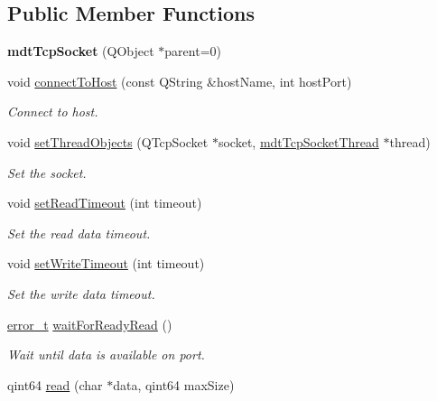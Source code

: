 \subsection*{Public Member Functions}
\begin{DoxyCompactItemize}
\item 
\hypertarget{classmdt_tcp_socket_aeed1a50725a8e61f86de2bf67a92feb8}{
{\bfseries mdtTcpSocket} (QObject $\ast$parent=0)}
\label{classmdt_tcp_socket_aeed1a50725a8e61f86de2bf67a92feb8}

\item 
void \hyperlink{classmdt_tcp_socket_aa5b229a668c0d9b083f8eec8efe4636f}{connectToHost} (const QString \&hostName, int hostPort)
\begin{DoxyCompactList}\small\item\em Connect to host. \end{DoxyCompactList}\item 
void \hyperlink{classmdt_tcp_socket_a8a57e4b49f56c301c5f8d7a9ec191e87}{setThreadObjects} (QTcpSocket $\ast$socket, \hyperlink{classmdt_tcp_socket_thread}{mdtTcpSocketThread} $\ast$thread)
\begin{DoxyCompactList}\small\item\em Set the socket. \end{DoxyCompactList}\item 
void \hyperlink{classmdt_tcp_socket_aae23057f2e0ee326d0fee78ffe3f00f9}{setReadTimeout} (int timeout)
\begin{DoxyCompactList}\small\item\em Set the read data timeout. \end{DoxyCompactList}\item 
void \hyperlink{classmdt_tcp_socket_ac59d2dfdf405b5382f0f20d5b9f75fd0}{setWriteTimeout} (int timeout)
\begin{DoxyCompactList}\small\item\em Set the write data timeout. \end{DoxyCompactList}\item 
\hyperlink{classmdt_abstract_port_ad4121bb930c95887e77f8bafa065a85e}{error\_\-t} \hyperlink{classmdt_tcp_socket_adb09186cdacdac15291523c59f156cd4}{waitForReadyRead} ()
\begin{DoxyCompactList}\small\item\em Wait until data is available on port. \end{DoxyCompactList}\item 
qint64 \hyperlink{classmdt_tcp_socket_a78842bc5ddcac2d96fb368ee575214cd}{read} (char $\ast$data, qint64 maxSize)

\end{DoxyCompactItemize}
